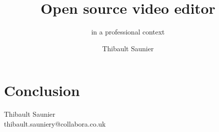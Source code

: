 \documentclass[a4paper,11pt]{article}
\begin{document}
\title{Open source video editor}
\subtitle{in a professional context}
\author{Thibault Saunier}
\withdate
\subject{Open source video editor in a professional context}
\maketitle

\tableofcontents



\section{Conclusion}

\newpage
{}

Thibault Saunier\\
thibault.sauniery@collabora.co.uk
\end{document}
